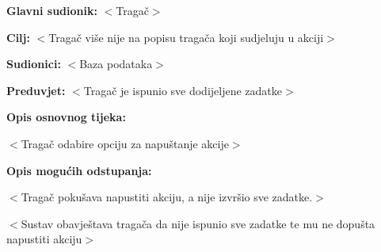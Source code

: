 					\noindent {}
					\begin{packed_item}
						
						\item \textbf{Glavni sudionik: }$<$Tragač$>$
						\item  \textbf{Cilj:} $<$Tragač više nije na popisu tragača koji sudjeluju u akciji$>$
						\item  \textbf{Sudionici:} $<$Baza podataka$>$
						\item  \textbf{Preduvjet:} $<$Tragač je ispunio sve dodijeljene zadatke$>$
						\item  \textbf{Opis osnovnog tijeka:}
						
						\item[] \begin{packed_enum}
							
							\item $<$Tragač odabire opciju za napuštanje akcije$>$
	
						\end{packed_enum}
						
					\end{packed_item}
					
					\item  \textbf{Opis mogućih odstupanja:}
					
					\item[] \begin{packed_item}
						
						\item[1.a] $<$Tragač pokušava napustiti akciju, a nije izvršio sve zadatke.$>$
						\item[] \begin{packed_enum}
							
							\item $<$Sustav obavještava tragača da nije ispunio sve zadatke te mu ne dopušta napustiti akciju$>$
							
						\end{packed_enum}
						
					\end{packed_item}
					
					
					
